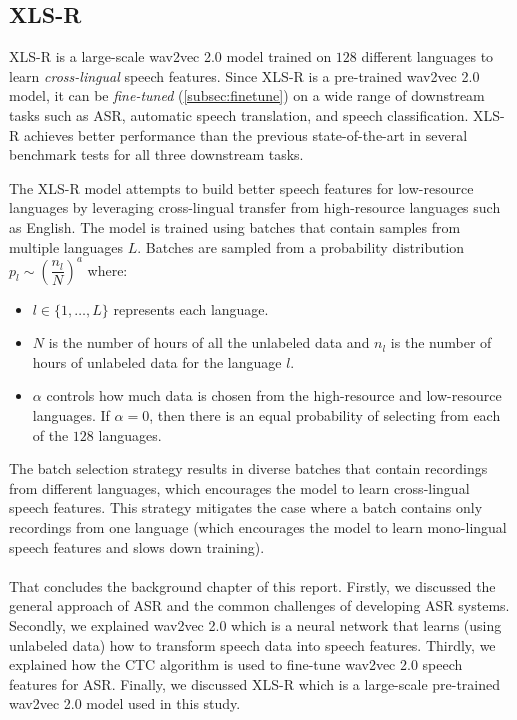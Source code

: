 \subsection{XLS-R}
XLS-R \cite{babu2021xls} is a large-scale wav2vec 2.0 model trained on $128$ different languages to learn \emph{cross-lingual} speech features.
Since XLS-R is a pre-trained wav2vec 2.0 model, it can be \emph{fine-tuned} (\ref{subsec:finetune}) on a wide range of downstream tasks such as ASR, automatic speech translation, and speech classification.
XLS-R achieves better performance than the previous state-of-the-art in several benchmark tests for all three downstream tasks.

The XLS-R model attempts to build better speech features for low-resource languages by leveraging cross-lingual transfer from high-resource languages such as English.
The model is trained using batches that contain samples from multiple languages $L$. 
Batches are sampled from a probability distribution $p_l \sim \left(\dfrac{n_l}{N}\right)^{a}$ where:
\begin{itemize}
    \item $l \in \{1, \dots, L\}$ represents each language.
    \item $N$ is the number of hours of all the unlabeled data and $n_l$ is the number of hours of unlabeled data for the language $l$.
    \item $\alpha$ controls how much data is chosen from the high-resource and low-resource languages. If $\alpha = 0$, then there is an equal probability of selecting from each of the $128$ languages. 
\end{itemize}
The batch selection strategy results in diverse batches that contain recordings from different languages, which encourages the model to learn cross-lingual speech features.
This strategy mitigates the case where a batch contains only recordings from one language (which encourages the model to learn mono-lingual speech features and slows down training).
\\
\\
That concludes the background chapter of this report. Firstly, we discussed the general approach of ASR and the common challenges of developing ASR systems.
Secondly, we explained wav2vec 2.0 which is a neural network that learns (using unlabeled data) how to transform speech data into speech features.
Thirdly, we explained how the CTC algorithm is used to fine-tune wav2vec 2.0 speech features for ASR.
Finally, we discussed XLS-R which is a large-scale pre-trained wav2vec 2.0 model used in this study.